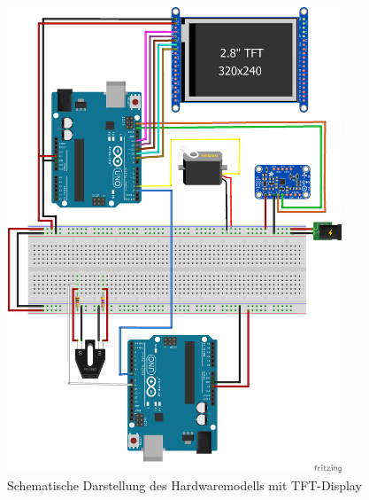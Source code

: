 \begin{figure}[H]
	\centering
	\includegraphics[width=10cm]{images/chapter/05/hardware-layout_future.png}
	\caption{Schematische Darstellung des Hardwaremodells mit TFT-Display}
	\label{fig:schema_hardware_future}
\end{figure}
